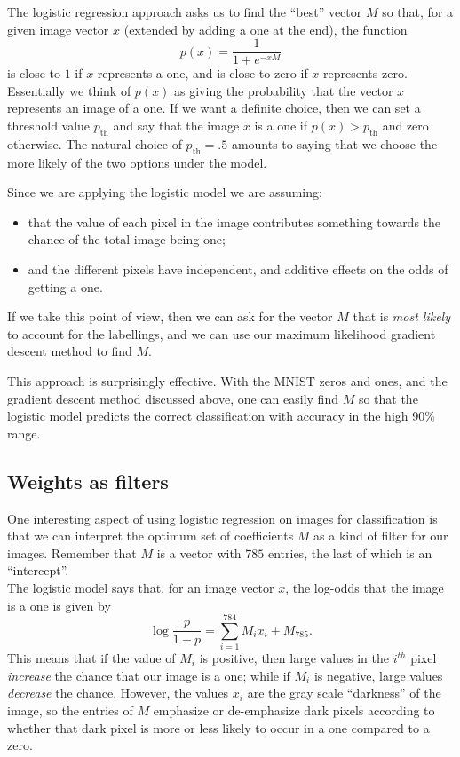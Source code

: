 \documentclass[
  11pt,
  letterpaper,
]{scrbook}
\providecommand{\tightlist}{%
  \setlength{\itemsep}{0pt}\setlength{\parskip}{0pt}}\usepackage{longtable,booktabs,array}
\theoremstyle{plain}
\theoremstyle{remark}
\begin{document}
The logistic regression approach asks us to find the ``best'' vector
\(M\) so that, for a given image vector \(x\) (extended by adding a one
at the end), the function \[
p(x)=\frac{1}{1+e^{-xM}}
\] is close to \(1\) if \(x\) represents a one, and is close to zero if
\(x\) represents zero. Essentially we think of \(p(x)\) as giving the
probability that the vector \(x\) represents an image of a one. If we
want a definite choice, then we can set a threshold value
\(p_{\mathrm{th}}\) and say that the image \(x\) is a one if
\(p(x)>p_{\mathrm{th}}\) and zero otherwise. The natural choice of
\(p_{\mathrm{th}}=.5\) amounts to saying that we choose the more likely
of the two options under the model.

Since we are applying the logistic model we are assuming:

\begin{itemize}
\tightlist
\item
  that the value of each pixel in the image contributes something
  towards the chance of the total image being one;
\item
  and the different pixels have independent, and additive effects on the
  odds of getting a one.
\end{itemize}

If we take this point of view, then we can ask for the vector \(M\) that
is \emph{most likely} to account for the labellings, and we can use our
maximum likelihood gradient descent method to find \(M\).

This approach is surprisingly effective. With the MNIST zeros and ones,
and the gradient descent method discussed above, one can easily find
\(M\) so that the logistic model predicts the correct classification
with accuracy in the high 90\% range.

\hypertarget{weights-as-filters}{%
\subsection{Weights as filters}\label{weights-as-filters}}

One interesting aspect of using logistic regression on images for
classification is that we can interpret the optimum set of coefficients
\(M\) as a kind of filter for our images. Remember that \(M\) is a
vector with \(785\) entries, the last of which is an ``intercept''.\\
The logistic model says that, for an image vector \(x\), the log-odds
that the image is a one is given by \[
\log \frac{p}{1-p} = \sum_{i=1}^{784} M_{i}x_{i} + M_{785}.
\] This means that if the value of \(M_{i}\) is positive, then large
values in the \(i^{th}\) pixel \emph{increase} the chance that our image
is a one; while if \(M_{i}\) is negative, large values \emph{decrease}
the chance. However, the values \(x_{i}\) are the gray scale
``darkness'' of the image, so the entries of \(M\) emphasize or
de-emphasize dark pixels according to whether that dark pixel is more or
less likely to occur in a one compared to a zero.
\end{document}
